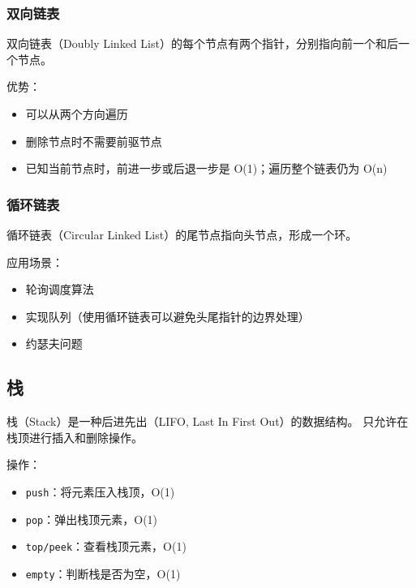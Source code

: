 \subsubsection{双向链表}

双向链表（Doubly Linked List）的每个节点有两个指针，分别指向前一个和后一个节点。

优势：
\begin{itemize}
  \item 可以从两个方向遍历
  \item 删除节点时不需要前驱节点
  \item 已知当前节点时，前进一步或后退一步是 O(1)；遍历整个链表仍为 O(n)
\end{itemize}

\subsubsection{循环链表}

循环链表（Circular Linked List）的尾节点指向头节点，形成一个环。

应用场景：
\begin{itemize}
  \item 轮询调度算法
  \item 实现队列（使用循环链表可以避免头尾指针的边界处理）
  \item 约瑟夫问题
\end{itemize}

\subsection{栈}


栈（Stack）是一种后进先出（LIFO, Last In First Out）的数据结构。
只允许在栈顶进行插入和删除操作。

操作：
\begin{itemize}
  \item \texttt{push}：将元素压入栈顶，O(1)
  \item \texttt{pop}：弹出栈顶元素，O(1)
  \item \texttt{top/peek}：查看栈顶元素，O(1)
  \item \texttt{empty}：判断栈是否为空，O(1)
\end{itemize}


